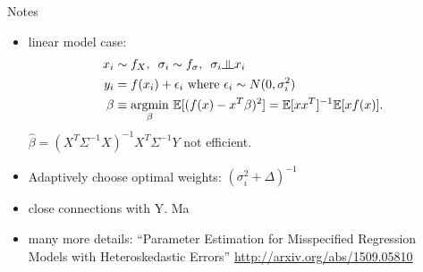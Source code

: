 \documentclass[12pt]{beamer}
\newcommand{\argmin}[1]{\underset{#1}{\operatorname{argmin}}\text{ }}
\newcommand{\E}{\mathbb{E}}
\newcommand{\indep}{\rotatebox[origin=c]{90}{$\models$}}
\begin{document}
\begin{frame}{Notes}
\begin{itemize}
\item linear model case:
\begin{align*}
x_i &\sim f_X, \, \, \, \sigma_i \sim f_\sigma, \, \, \, \sigma_i \indep x_i\\
y_i &= f(x_i) + \epsilon_i \text{ where } \epsilon_i \sim N(0,\sigma_i^2)\\
\beta &\equiv \argmin{\beta} \E[(f(x) - x^T\beta)^2] = \E[xx^T]^{-1}\E[xf(x)].
\end{align*}
$\widehat{\beta} = (X^T\Sigma^{-1}X)^{-1}X^T\Sigma^{-1}Y$ not efficient.
\item Adaptively choose optimal weights: $(\sigma_i^2 + \Delta)^{-1}$
\item close connections with Y. Ma \cite{ma2006efficient,ma2013doubly}
\item many more details: ``Parameter Estimation for Misspecified Regression Models with Heteroskedastic Errors'' \url{http://arxiv.org/abs/1509.05810}
\end{itemize}
\end{frame}






\end{document}
